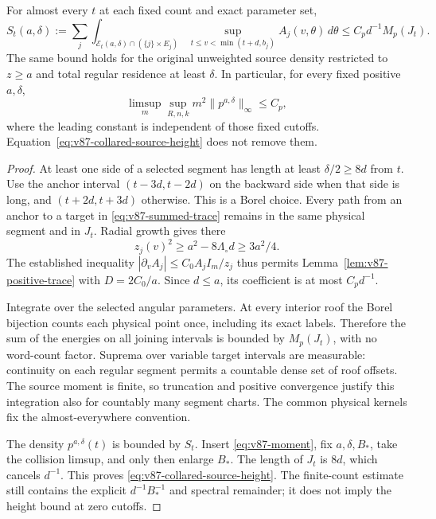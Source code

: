 \begin{theorem}
\label{thm:v87-summed-trace}
For almost every $t$ at each fixed count and exact parameter set,
\begin{equation}\label{eq:v87-summed-trace}
 S_t(a,\delta):=
 \sum_j\int_{\mathcal E_t(a,\delta)\cap(\{j\}\times E_j)}
    \sup_{t\le v<\min(t+d,b_j)}A_j(v,\theta)\,d\theta
                  \le C_p d^{-1}M_p(J_t).
\end{equation}
The same bound holds for the original unweighted source density
restricted to $z\ge a$ and total regular residence at least $\delta$.
In particular, for every fixed positive $a,\delta$,
\begin{equation}\label{eq:v87-collared-source-height}
 \limsup_m\sup_{R,n,k}m^2\|p^{a,\delta}\|_\infty\le C_p,
\end{equation}
where the leading constant is independent of those fixed cutoffs.
Equation~\eqref{eq:v87-collared-source-height} does not remove them.
\end{theorem}
\begin{proof}
At least one side of a selected segment has length at least
$\delta/2\ge8d$ from $t$. Use the anchor interval
$(t-3d,t-2d)$ on the backward side when that side is long, and
$(t+2d,t+3d)$ otherwise. This is a Borel choice. Every path from
an anchor to a target in \eqref{eq:v87-summed-trace} remains in the
same physical segment and in $J_t$. Radial growth gives there
\[
 z_j(v)^2\ge a^2-8\Lambda_\circ d\ge3a^2/4.
\]
The established inequality $|\partial_vA_j|\le C_0A_jI_m/z_j$
thus permits Lemma~\ref{lem:v87-positive-trace} with $D=2C_0/a$.
Since $d\le a$, its coefficient is at most $C_pd^{-1}$.

Integrate over the selected angular parameters. At every interior
roof the Borel bijection counts each physical point once, including
its exact labels. Therefore the sum of the energies on all joining
intervals is bounded by $M_p(J_t)$, with no word-count factor.
Suprema over variable target intervals are measurable: continuity on
each regular segment permits a countable dense set of roof offsets.
The source moment is finite, so truncation and positive convergence
justify this integration also for countably many segment charts.
The common physical kernels fix the almost-everywhere convention.

The density $p^{a,\delta}(t)$ is bounded by $S_t$. Insert
\eqref{eq:v87-moment}, fix $a,\delta,B_*$, take the collision
limsup, and only then enlarge $B_*$. The length of $J_t$ is $8d$,
which cancels $d^{-1}$. This proves
\eqref{eq:v87-collared-source-height}. The finite-count estimate still
contains the explicit $d^{-1}B_*^{-1}$ and spectral remainder;
it does not imply the height bound at zero cutoffs.
\end{proof}
